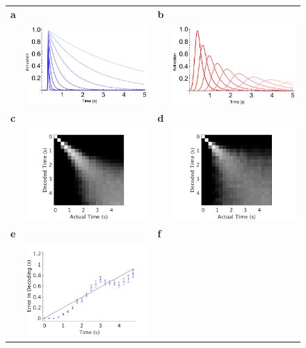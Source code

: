 \documentclass{apa}
\begin{document}
\begin{figure}
\begin{tabular}[t]{l c l c}
\textbf{a} & & \textbf{b}& \\
&
\includegraphics[width=.4\linewidth]{figs/ExpDecParams.pdf}
&
&
\includegraphics[width=.4\linewidth]{figs/TimeCellParams.pdf}
\\
\textbf{c} & & \textbf{d}& \\
 & \includegraphics[width=.45\linewidth]{figs/LogPosteriorExpDecay_75noiseV3.png}
& & \includegraphics[width=.45\linewidth]{figs/LogPosteriorTimeCells_20noiseV3.png}
\\
\textbf{e} & & \textbf{f}& \\
 & \includegraphics[width=.4\linewidth]{figs/AbsErrorExpDecay_75noiseV3.png} 

\end{tabular}
\end{figure}
\end{document}
